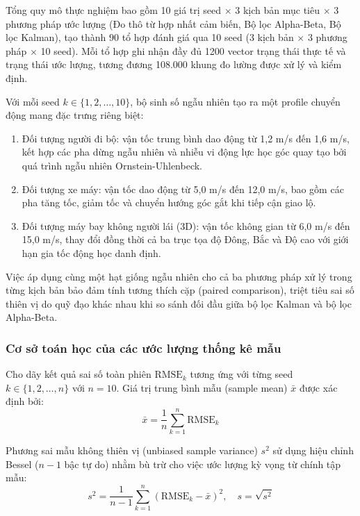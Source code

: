 Tổng quy mô thực nghiệm bao gồm 10 giá trị seed $\times$ 3 kịch bản mục tiêu $\times$ 3 phương pháp ước lượng (Đo thô từ hợp nhất cảm biến, Bộ lọc Alpha-Beta, Bộ lọc Kalman), tạo thành $90$ tổ hợp đánh giá qua 10 seed (3 kịch bản $\times$ 3 phương pháp $\times$ 10 seed). Mỗi tổ hợp ghi nhận đầy đủ 1200 vector trạng thái thực tế và trạng thái ước lượng, tương đương 108.000 khung đo lường được xử lý và kiểm định.

Với mỗi seed $k \in \{1, 2, \dots, 10\}$, bộ sinh số ngẫu nhiên tạo ra một profile chuyển động mang đặc trưng riêng biệt:
\begin{enumerate}
    \item Đối tượng người đi bộ: vận tốc trung bình dao động từ 1,2 m/s đến 1,6 m/s, kết hợp các pha dừng ngẫu nhiên và nhiễu vi động lực học góc quay tạo bởi quá trình ngẫu nhiên Ornstein-Uhlenbeck.
    \item Đối tượng xe máy: vận tốc dao động từ 5,0 m/s đến 12,0 m/s, bao gồm các pha tăng tốc, giảm tốc và chuyển hướng góc gắt khi tiếp cận giao lộ.
    \item Đối tượng máy bay không người lái (3D): vận tốc không gian từ 6,0 m/s đến 15,0 m/s, thay đổi đồng thời cả ba trục tọa độ Đông, Bắc và Độ cao với giới hạn gia tốc động học danh định.
\end{enumerate}

Việc áp dụng cùng một hạt giống ngẫu nhiên cho cả ba phương pháp xử lý trong từng kịch bản bảo đảm tính tương thích cặp (paired comparison), triệt tiêu sai số thiên vị do quỹ đạo khác nhau khi so sánh đối đầu giữa bộ lọc Kalman \cite{welch1995kalman} và bộ lọc Alpha-Beta.

\subsubsection{Cơ sở toán học của các ước lượng thống kê mẫu}

\hspace{0.5cm} Cho dãy kết quả sai số toàn phiên $\text{RMSE}_k$ tương ứng với từng seed $k \in \{1, 2, \dots, n\}$ với $n = 10$. Giá trị trung bình mẫu (sample mean) $\bar{x}$ được xác định bởi:
\begin{equation}
\bar{x} = \frac{1}{n} \sum_{k=1}^{n} \text{RMSE}_k
\label{eq:sample-mean}
\end{equation}

Phương sai mẫu không thiên vị (unbiased sample variance) $s^2$ sử dụng hiệu chỉnh Bessel ($n-1$ bậc tự do) nhằm bù trừ cho việc ước lượng kỳ vọng từ chính tập mẫu:
\begin{equation}
s^2 = \frac{1}{n - 1} \sum_{k=1}^{n} \left(\text{RMSE}_k - \bar{x}\right)^2, \quad s = \sqrt{s^2}
\label{eq:sample-std}
\end{equation}

